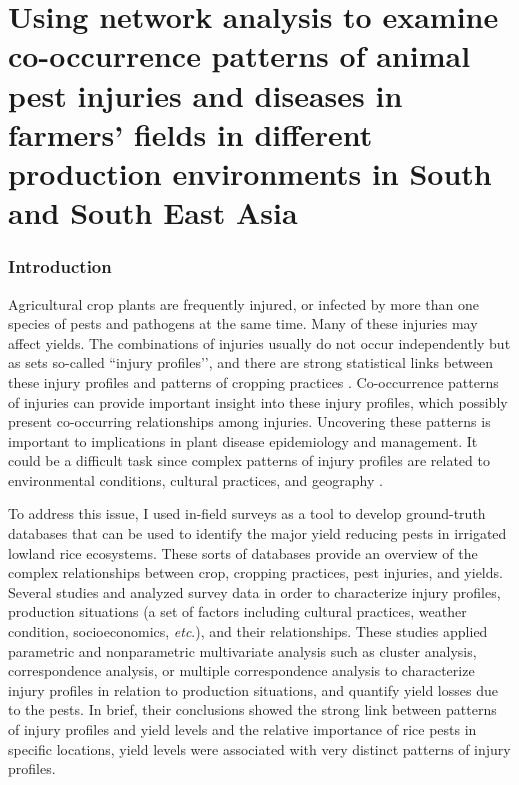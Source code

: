 \chapter{Using network analysis to examine co-occurrence patterns of animal pest injuries and diseases in farmers' fields in different production environments in South and South East Asia}

\subsection{Introduction}

Agricultural crop plants are frequently injured, or infected by more than one species of pests and pathogens at the same time. Many of these injuries may affect yields. The combinations of injuries usually do not occur independently but as sets so-called ``injury profiles’’, and there are strong statistical links between these injury profiles and patterns of cropping practices \citep{Savary_2006_Quantification}. Co-occurrence patterns of injuries can provide important insight into these injury profiles, which possibly present co-occurring relationships among injuries. Uncovering these patterns is important to implications in plant disease epidemiology and management. It could be a difficult task since complex patterns of injury profiles are related to environmental conditions, cultural practices, and geography \citep{Willocquet_2008_Simulating}. 

To address this issue, I used in-field surveys as a tool to develop ground-truth databases that can be used to identify the major yield reducing pests in irrigated lowland rice ecosystems. These sorts of databases provide an overview of the complex relationships between crop, cropping practices, pest injuries, and yields. Several studies \citet{Savary_2000_Quantification, Savary_2000_Characterization, Dong_2010_Characterization} and \citet{Reddy_2011_Characterizing} analyzed survey data in order to characterize injury profiles, production situations (a set of factors including cultural practices, weather condition, socioeconomics, \textit{etc}.), and their relationships. These studies applied parametric and nonparametric multivariate analysis such as cluster analysis, correspondence analysis, or multiple correspondence analysis to characterize injury profiles in relation to production situations, and quantify yield losses due to the pests. In brief, their conclusions showed the strong link between patterns of injury profiles and yield levels and the relative importance of rice pests in specific locations, yield levels were associated with very distinct patterns of injury profiles.

